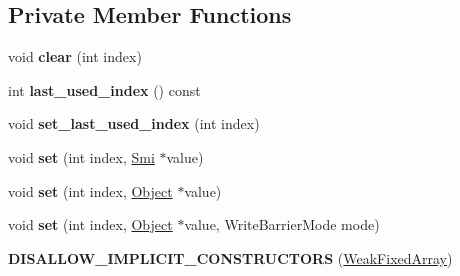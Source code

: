 \subsection*{Private Member Functions}
\begin{DoxyCompactItemize}
\item 
void {\bfseries clear} (int index)\hypertarget{classv8_1_1internal_1_1_weak_fixed_array_a9f5738fdd209639e14acb637074e9a03}{}\label{classv8_1_1internal_1_1_weak_fixed_array_a9f5738fdd209639e14acb637074e9a03}

\item 
int {\bfseries last\+\_\+used\+\_\+index} () const \hypertarget{classv8_1_1internal_1_1_weak_fixed_array_af65ec76622aee24bf3f13766a66ba90a}{}\label{classv8_1_1internal_1_1_weak_fixed_array_af65ec76622aee24bf3f13766a66ba90a}

\item 
void {\bfseries set\+\_\+last\+\_\+used\+\_\+index} (int index)\hypertarget{classv8_1_1internal_1_1_weak_fixed_array_a20307f5e019f723d428b6263802eeb0a}{}\label{classv8_1_1internal_1_1_weak_fixed_array_a20307f5e019f723d428b6263802eeb0a}

\item 
void {\bfseries set} (int index, \hyperlink{classv8_1_1internal_1_1_smi}{Smi} $\ast$value)\hypertarget{classv8_1_1internal_1_1_weak_fixed_array_a800d56ceaba8ac57109d61fdda3b6fbe}{}\label{classv8_1_1internal_1_1_weak_fixed_array_a800d56ceaba8ac57109d61fdda3b6fbe}

\item 
void {\bfseries set} (int index, \hyperlink{classv8_1_1internal_1_1_object}{Object} $\ast$value)\hypertarget{classv8_1_1internal_1_1_weak_fixed_array_a32877082ab9d7067d7559232ba7ffaa2}{}\label{classv8_1_1internal_1_1_weak_fixed_array_a32877082ab9d7067d7559232ba7ffaa2}

\item 
void {\bfseries set} (int index, \hyperlink{classv8_1_1internal_1_1_object}{Object} $\ast$value, Write\+Barrier\+Mode mode)\hypertarget{classv8_1_1internal_1_1_weak_fixed_array_aa8bd324490ec8385630149eb6bf7dea0}{}\label{classv8_1_1internal_1_1_weak_fixed_array_aa8bd324490ec8385630149eb6bf7dea0}

\item 
{\bfseries D\+I\+S\+A\+L\+L\+O\+W\+\_\+\+I\+M\+P\+L\+I\+C\+I\+T\+\_\+\+C\+O\+N\+S\+T\+R\+U\+C\+T\+O\+RS} (\hyperlink{classv8_1_1internal_1_1_weak_fixed_array}{Weak\+Fixed\+Array})\hypertarget{classv8_1_1internal_1_1_weak_fixed_array_acfd806555c45328db128fda8abf54c96}{}\label{classv8_1_1internal_1_1_weak_fixed_array_acfd806555c45328db128fda8abf54c96}

\end{DoxyCompactItemize}
